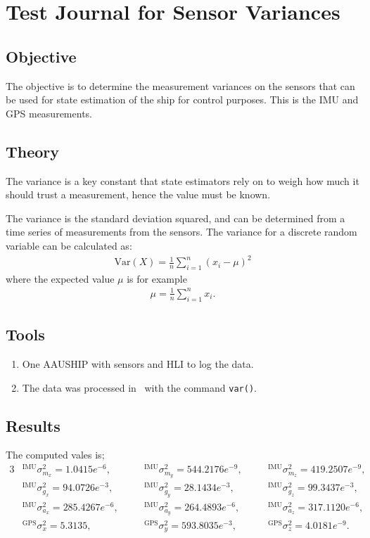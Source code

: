 \chapter{Test Journal for Sensor Variances}
\label{sc:variances}

\section{Objective}
The objective is to determine the measurement variances on the sensors
that can be used for state estimation of the ship for control
purposes. This is the \ac{IMU} and \ac{GPS} measurements.

\section{Theory}
The variance is a key constant that state estimators rely on to weigh
how much it should trust a measurement, hence the value must be known.

The variance is the standard deviation squared, and can be determined
from a time series of measurements from the sensors. The variance for
a discrete random variable can be calculated as:
\begin{align}
	\mathrm{Var}(X) = \frac{1}{n} \sum_{i=1}^n (x_i - \mu) ^2
\end{align}
where the expected value $\mu$ is for example
\begin{align}
	\mu = \frac{1}{n} \sum_{i=1}^n x_i.
\end{align}

\section{Tools}
\begin{enumerate}
	\item One AAUSHIP with sensors and \ac{HLI} to log the data.
	\item The data was processed in \MATLAB\ with the command
		\texttt{var()}.
\end{enumerate}

\section{Results}

The computed vales is;
\begin{alignat*}{3}
&^\text{IMU}\sigma_{m_x}^2 = 1.0415e^{-6},
\quad& &
^\text{IMU}\sigma_{m_y}^2 = 544.2176e^{-9},
\quad& &
^\text{IMU}\sigma_{m_z}^2 = 419.2507e^{-9},
\\ \nonumber
&^\text{IMU}\sigma_{g_x}^2 = 94.0726e^{-3},
\quad& &
^\text{IMU}\sigma_{g_y}^2 = 28.1434e^{-3},
\quad& &
^\text{IMU}\sigma_{g_z}^2 = 99.3437e^{-3},
\\ \nonumber
&^\text{IMU}\sigma_{a_x}^2 = 285.4267e^{-6},
\quad& &
^\text{IMU}\sigma_{a_y}^2 = 264.4893e^{-6},
\quad& &
^\text{IMU}\sigma_{a_z}^2 = 317.1120e^{-6},
\\ \nonumber
&^\text{GPS}\sigma_{x}^2 = 5.3135,
\quad& &
^\text{GPS}\sigma_{y}^2 = 593.8035e^{-3},
\quad& &
^\text{GPS}\sigma_{z}^2 = 4.0181e^{-9}.
\end{alignat*}

